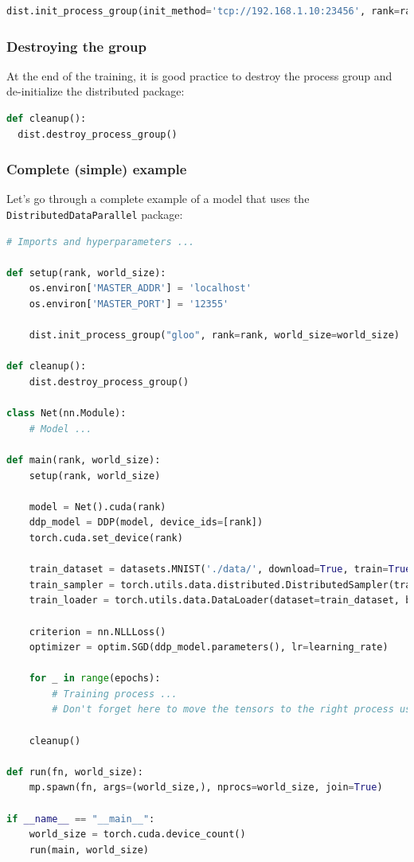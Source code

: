 \documentclass{article}
\begin{document}
\begin{lstlisting}[language=Python]
dist.init_process_group(init_method='tcp://192.168.1.10:23456', rank=rank, world_size=size)
\end{lstlisting}

\subsubsection{Destroying the group}
At the end of the training, it is good practice to destroy the process group and de-initialize the distributed package:
\begin{lstlisting}[language=Python]
def cleanup():
  dist.destroy_process_group()
\end{lstlisting}

\subsubsection{Complete (simple) example}
Let's go through a complete example of a model that uses the \lstinline{DistributedDataParallel} package:
\begin{lstlisting}[language=Python]
# Imports and hyperparameters ...

def setup(rank, world_size):
    os.environ['MASTER_ADDR'] = 'localhost'
    os.environ['MASTER_PORT'] = '12355'

    dist.init_process_group("gloo", rank=rank, world_size=world_size)

def cleanup():
    dist.destroy_process_group()

class Net(nn.Module):
    # Model ...

def main(rank, world_size):
    setup(rank, world_size)

    model = Net().cuda(rank)
    ddp_model = DDP(model, device_ids=[rank])
    torch.cuda.set_device(rank)

    train_dataset = datasets.MNIST('./data/', download=True, train=True, transform=transform)
    train_sampler = torch.utils.data.distributed.DistributedSampler(train_dataset, num_replicas=world_size, rank=rank, shuffle=False)
    train_loader = torch.utils.data.DataLoader(dataset=train_dataset, batch_size=batch_size, shuffle=False, pin_memory=True, sampler=train_sampler)

    criterion = nn.NLLLoss()
    optimizer = optim.SGD(ddp_model.parameters(), lr=learning_rate)

    for _ in range(epochs):
        # Training process ...
        # Don't forget here to move the tensors to the right process using the .cuda(rank) method!

    cleanup()

def run(fn, world_size):
    mp.spawn(fn, args=(world_size,), nprocs=world_size, join=True)

if __name__ == "__main__":
    world_size = torch.cuda.device_count()
    run(main, world_size)
\end{lstlisting}
\end{document}

